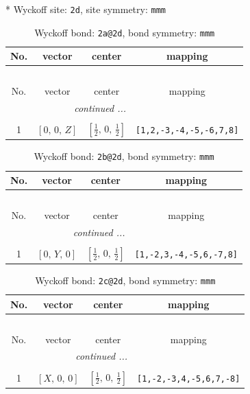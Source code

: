 \documentclass[fleqn,8pt]{jsarticle}
\begin{document}
* Wyckoff site: {\tt 2d}, site symmetry: {\tt mmm}
\renewcommand{\arraystretch}{1.2}
\begin{longtable}{cccc}
\caption{Wyckoff bond: {\tt 2a@2d}, bond symmetry: {\tt mmm}}
 \\
 \hline \hline
No. & vector & center & mapping \\ \hline \endfirsthead

\multicolumn{3}{l}{\tablename\ \thetable{}} \\
 \hline \hline
No. & vector & center & mapping \\ \hline \endhead

 \hline \hline
\multicolumn{3}{r}{\footnotesize\it continued ...} \\ \endfoot

 \hline \hline
\multicolumn{3}{r}{} \\ \endlastfoot

1 & $\left[ 0,\, 0,\, Z \right]$ & $\left[ \frac{1}{2},\, 0,\, \frac{1}{2} \right]$ & {\tt [1,2,-3,-4,-5,-6,7,8]} \\
\end{longtable}
\renewcommand{\arraystretch}{1.2}
\begin{longtable}{cccc}
\caption{Wyckoff bond: {\tt 2b@2d}, bond symmetry: {\tt mmm}}
 \\
 \hline \hline
No. & vector & center & mapping \\ \hline \endfirsthead

\multicolumn{3}{l}{\tablename\ \thetable{}} \\
 \hline \hline
No. & vector & center & mapping \\ \hline \endhead

 \hline \hline
\multicolumn{3}{r}{\footnotesize\it continued ...} \\ \endfoot

 \hline \hline
\multicolumn{3}{r}{} \\ \endlastfoot

1 & $\left[ 0,\, Y,\, 0 \right]$ & $\left[ \frac{1}{2},\, 0,\, \frac{1}{2} \right]$ & {\tt [1,-2,3,-4,-5,6,-7,8]} \\
\end{longtable}
\renewcommand{\arraystretch}{1.2}
\begin{longtable}{cccc}
\caption{Wyckoff bond: {\tt 2c@2d}, bond symmetry: {\tt mmm}}
 \\
 \hline \hline
No. & vector & center & mapping \\ \hline \endfirsthead

\multicolumn{3}{l}{\tablename\ \thetable{}} \\
 \hline \hline
No. & vector & center & mapping \\ \hline \endhead

 \hline \hline
\multicolumn{3}{r}{\footnotesize\it continued ...} \\ \endfoot

 \hline \hline
\multicolumn{3}{r}{} \\ \endlastfoot

1 & $\left[ X,\, 0,\, 0 \right]$ & $\left[ \frac{1}{2},\, 0,\, \frac{1}{2} \right]$ & {\tt [1,-2,-3,4,-5,6,7,-8]} \\
\end{longtable}
\end{document}
